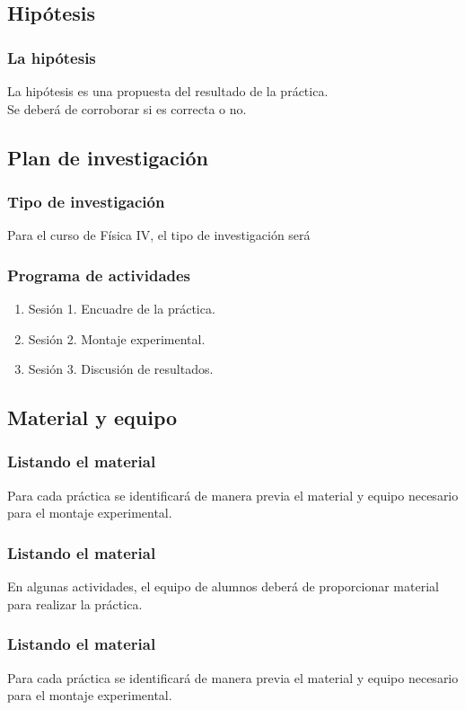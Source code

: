 \documentclass[14pt]{beamer}
\begin{document}
\subsection{Hipótesis}

\begin{frame}
\frametitle{La hipótesis}
La hipótesis es una propuesta del resultado de la práctica.
\\
\bigskip
\pause
Se deberá de corroborar si es correcta o no.
\end{frame}

\subsection{Plan de investigación}

\begin{frame}
\frametitle{Tipo de investigación}
Para el curso de Física IV, el tipo de investigación será 
\end{frame}
\begin{frame}
\frametitle{Programa de actividades}
\begin{enumerate}[<+->]
\item Sesión 1. Encuadre de la práctica.
\item Sesión 2. Montaje experimental.
\item Sesión 3. Discusión de resultados.
\end{enumerate}
\end{frame}

\subsection{Material y equipo}

\begin{frame}
\frametitle{Listando el material}
Para cada práctica se identificará de manera previa el material y equipo necesario para el montaje experimental.
\end{frame}
\begin{frame}
\frametitle{Listando el material}
En algunas actividades, el equipo de alumnos deberá de proporcionar material para realizar la práctica.
\end{frame}
\begin{frame}
\frametitle{Listando el material}
Para cada práctica se identificará de manera previa el material y equipo necesario para el montaje experimental.
\end{frame}
\end{document}
